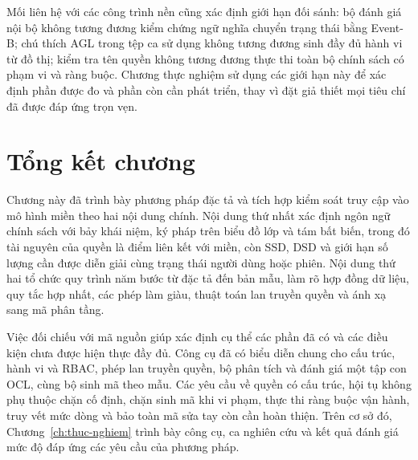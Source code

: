 Mối liên hệ với các công trình nền cũng xác định giới hạn đối sánh: bộ đánh giá nội bộ không tương đương kiểm chứng ngữ nghĩa chuyển trạng thái bằng Event-B; chú thích AGL trong tệp ca sử dụng không tương đương sinh đầy đủ hành vi từ đồ thị; kiểm tra tên quyền không tương đương thực thi toàn bộ chính sách có phạm vi và ràng buộc. Chương thực nghiệm sử dụng các giới hạn này để xác định phần được đo và phần còn cần phát triển, thay vì đặt giả thiết mọi tiêu chí đã được đáp ứng trọn vẹn.

\section{Tổng kết chương}
\label{sec:tong-ket-c3}

Chương này đã trình bày phương pháp đặc tả và tích hợp kiểm soát truy cập vào mô hình miền theo hai nội dung chính. Nội dung thứ nhất xác định ngôn ngữ chính sách với bảy khái niệm, ký pháp trên biểu đồ lớp và tám bất biến, trong đó tài nguyên của quyền là điểm liên kết với miền, còn SSD, DSD và giới hạn số lượng cần được diễn giải cùng trạng thái người dùng hoặc phiên. Nội dung thứ hai tổ chức quy trình năm bước từ đặc tả đến bản mẫu, làm rõ hợp đồng dữ liệu, quy tắc hợp nhất, các phép làm giàu, thuật toán lan truyền quyền và ánh xạ sang mã phân tầng.

Việc đối chiếu với mã nguồn giúp xác định cụ thể các phần đã có và các điều kiện chưa được hiện thực đầy đủ. Công cụ đã có biểu diễn chung cho cấu trúc, hành vi và RBAC, phép lan truyền quyền, bộ phân tích và đánh giá một tập con OCL, cùng bộ sinh mã theo mẫu. Các yêu cầu về quyền có cấu trúc, hội tụ không phụ thuộc chặn cố định, chặn sinh mã khi vi phạm, thực thi ràng buộc vận hành, truy vết mức dòng và bảo toàn mã sửa tay còn cần hoàn thiện. Trên cơ sở đó, Chương~\ref{ch:thuc-nghiem} trình bày công cụ, ca nghiên cứu và kết quả đánh giá mức độ đáp ứng các yêu cầu của phương pháp.

\endgroup
